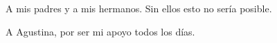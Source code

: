 
\cleardoublepage

\vspace{15ex}


A mis padres y a mis hermanos. Sin ellos esto no sería posible.
\medskip

A Agustina, por ser mi apoyo todos los días.
\medskip
